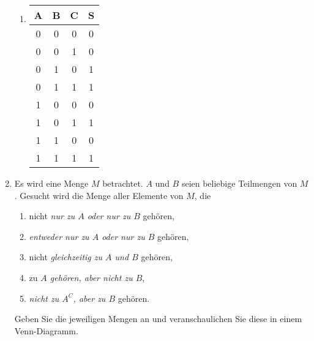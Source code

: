 \documentclass[12pt,a4paper]{scrreprt}
\begin{document}
\begin{enumerate}
\begin{center}
\begin{enumerate}
		\item 
	
			\begin{tabular}{c c c| c}
				A & B & C &S \\
				\hline
				0	&0	&0	&0 \\
				0	&0	&1	&0 \\
				0	&1	&0	&1 \\
				0	&1	&1	&1 \\
				1	&0	&0	&0 \\
				1	& 0	&1	&1 \\
				1	&1	& 0	&0 \\
				1	&1	&1	&1 
			\end{tabular}
	
	\end{enumerate}
	\end{center}

    \item Es wird eine Menge $M$ betrachtet. $A$ und $B$ seien beliebige Teilmengen von $M$.  Gesucht wird die Menge aller Elemente von $M$, die

	\begin{enumerate}
		\item  nicht \textit{nur zu $A$ oder nur zu $B$} gehören,
		\item  \textit{entweder nur zu $A$ oder nur zu $B$} gehören,
		\item nicht \textit{gleichzeitig zu $A$ und $B$} gehören,
		\item zu \textit{$A$ gehören, aber nicht zu $B$},
		\item \textit{nicht zu $A^C$, aber zu $B$} gehören.
	\end{enumerate}
	
	Geben Sie die jeweiligen Mengen an und veranschaulichen Sie diese in einem Venn-Diagramm.


\end{enumerate}
\end{document}
